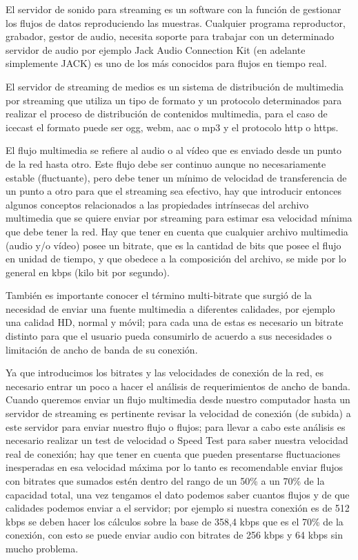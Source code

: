 \begin{multicols}{2}
El servidor de sonido para streaming es un software con la función de gestionar los flujos de datos 
reproduciendo las muestras. Cualquier programa reproductor, grabador, gestor de audio, necesita soporte para trabajar con un determinado servidor de audio por ejemplo Jack Audio Connection Kit (en adelante simplemente JACK) es uno de los más conocidos para flujos en tiempo real.

El servidor de streaming de medios es un sistema de distribución de multimedia por streaming que utiliza un tipo de formato y un protocolo determinados para realizar el proceso de distribución de contenidos multimedia, para el caso de icecast el formato puede ser ogg, webm, aac o mp3 y el protocolo http o https.

El flujo multimedia se refiere al audio o al vídeo que es enviado desde un punto de la red hasta otro. Este flujo debe ser continuo aunque no necesariamente estable (fluctuante), pero debe tener un mínimo de velocidad de transferencia de un punto a otro para que el streaming sea efectivo, hay que introducir entonces algunos conceptos relacionados a las propiedades intrínsecas del archivo multimedia que se quiere enviar por streaming para estimar esa velocidad mínima que debe tener la red. Hay que tener en cuenta que cualquier archivo multimedia (audio y/o vídeo) posee un bitrate, que es la cantidad de bits que posee el flujo en unidad de tiempo, y que obedece a la composición del archivo, se mide por lo general en kbps (kilo bit por segundo).

También es importante conocer el término multi-bitrate que surgió de la necesidad de enviar una fuente multimedia a diferentes calidades, por ejemplo una calidad HD, normal y móvil; para cada una de estas es necesario un bitrate distinto para que el usuario pueda consumirlo de acuerdo a sus necesidades o limitación de ancho de banda de su conexión.

Ya que introducimos los bitrates y las velocidades de conexión de la red, es necesario entrar un poco a hacer el análisis de requerimientos de ancho de banda. Cuando queremos enviar un flujo multimedia desde nuestro computador hasta un servidor de streaming es pertinente revisar la velocidad de conexión (de subida) a este servidor para enviar nuestro flujo o flujos; para llevar a cabo este análisis es necesario realizar  un test de velocidad o Speed Test para saber nuestra velocidad real de conexión; hay que tener en cuenta que pueden presentarse fluctuaciones inesperadas en esa velocidad máxima por lo tanto es recomendable enviar flujos con bitrates que sumados estén dentro del rango de un 50\% a un 70\% de la capacidad total, una vez tengamos el dato podemos saber cuantos flujos y de que calidades podemos enviar a el servidor; por ejemplo si nuestra conexión es de 512 kbps se deben hacer los cálculos sobre la base de 358,4 kbps que es el 70\% de la conexión, con esto se puede enviar audio con bitrates de 256 kbps y 64 kbps sin mucho problema.


\end{multicols}
